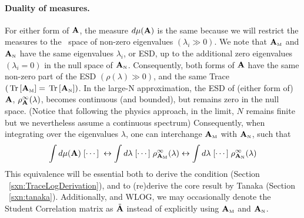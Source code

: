 \paragraph{Duality of measures.}
For either form of $\mathbf{A}$, the measure $d\mu(\mathbf{A})$ is the same because we will restrict the measures to the~\ECS
space of non-zero eigenvalues $(\lambda_{i}\gg 0)$.
We note that ${\mathbf{A}}_{\text{\tiny M}}$ and ${\mathbf{A}}_{\text{\tiny N}}$ have the same eigenvalues $\lambda_{i}$, or ESD,
up to the additional zero eigenvalues $(\lambda_{i}=0)$ in the null space of ${\mathbf{A}}_{\text{\tiny N}}$.  
Consequently, both forms of $\mathbf{A}$ have 
the same non-zero part
of the ESD $(\rho(\lambda)\gg 0)$, and the same Trace $(\mbox{}\operatorname{Tr}\left[{\mathbf{A}}_{\text{\tiny M}}\right]=\mbox{}\operatorname{Tr}\left[{\mathbf{A}}_{\text{\tiny N}}\right])$.
In the large-N approximation, the ESD of (either form of)
$\mathbf{A}$, $\rho^{\infty}_{\mathbf{A}}(\lambda)$,
becomes continuous (and bounded), but remains zero in the null space.
(Notice that following the physics approach, in the limit, $N$ remains finite but we nevertheless assume a continuous spectrum)
Consequently,
when integrating over the eigenvalues  $\lambda$, one can interchange
${\mathbf{A}}_{\text{\tiny M}}$  with ${\mathbf{A}}_{\text{\tiny N}}$, such that
\begin{align}
 \int d\mu(\mathbf{A})\;[\cdots]\;\leftrightarrow  \int d\lambda\;[\cdots]\; \rho^{\infty}_{{\mathbf{A}}_{\text{\tiny M}}}(\lambda) \leftrightarrow  \int d\lambda\;[\cdots]\; \rho^{\infty}_{{\mathbf{A}}_{\text{\tiny N}}}(\lambda)
\end{align}
This equivalence will be essential both to derive the \TRACELOG condition (Section ~\ref{sxn:TraceLogDerivation}),
and to (re)derive the core result by Tanaka (Section ~\ref{sxn:tanaka}).
Additionally, and WLOG, we may occasionally denote the Student Correlation matrix as
$\tilde{\mathbf{A}}$ instead of explicitly using  ${\mathbf{A}}_{\text{\tiny M}}$ and ${\mathbf{A}}_{\text{\tiny N}}$.

%


